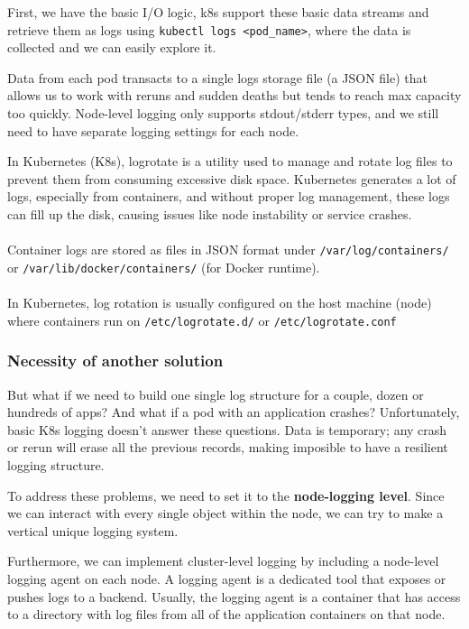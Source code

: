 \documentclass{article}
\newenvironment{blocktemplate}[1]{%
    \tcolorbox[beamer,%
    noparskip,breakable,
    colframe=Blue,%
    colbacklower=LimeGreen!75!LightGreen,%
    title=#1]}%
    {\endtcolorbox}
\begin{document}
First, we have the basic I/O logic, k8s support these basic data streams and retrieve them as logs using \verb|kubectl logs <pod_name>|, where the data is collected and we can easily explore it.

Data from each pod transacts to a single logs storage file (a JSON file)
that allows us to work with reruns and sudden deaths but tends 
to reach max capacity too quickly. 
Node-level logging only supports stdout/stderr types, 
and we still need to have separate logging settings for each node.

\begin{blocktemplate}{Note}
In Kubernetes (K8s), logrotate is a utility used to manage and rotate log files to prevent them from consuming excessive disk space. Kubernetes generates a lot of logs, especially from containers, and without proper log management, these logs can fill up the disk, causing issues like node instability or service crashes.
\\\\
Container logs are stored as files in JSON format under \verb|/var/log/containers/| or \verb|/var/lib/docker/containers/| (for Docker runtime).
\\\\
In Kubernetes, log rotation is usually configured on the host machine (node) where containers run on \verb|/etc/logrotate.d/| or \verb|/etc/logrotate.conf| 
\end{blocktemplate}

\subsubsection{Necessity of another solution}

But what if we need to build one single log structure for a couple, dozen or hundreds of apps? And what if a pod with an application crashes? 
Unfortunately, basic K8s logging doesn't answer these questions. 
Data is temporary; any crash or rerun will erase all the previous records, making imposible to have a resilient logging structure.

To address these problems, we need to set it to the \textbf{node-logging level}. Since we can interact with every single object within the node, we can try to make a vertical unique logging system. 

Furthermore, we can implement cluster-level logging by including a node-level logging agent on each node. A logging agent is a dedicated tool that exposes or pushes logs to a backend. Usually, the logging agent is a container that has access to a directory with log files from all of the application containers on that node.
\end{document}
